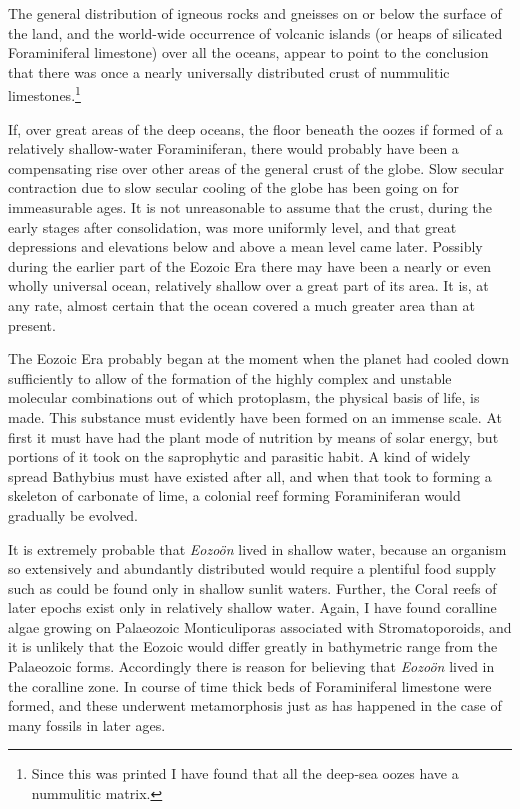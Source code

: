 \documentclass[a4paper, 12pt, oneside]{article}
\begin{document}
The general distribution of igneous rocks and gneisses on or below the surface of the land, and the world-wide occurrence of volcanic islands (or heaps of silicated Foraminiferal limestone) over all the oceans, appear to point to the conclusion that there was once a nearly universally distributed crust of nummulitic limestones.\footnote{Since this was printed I have found that all the deep-sea oozes have a nummulitic matrix.}

If, over great areas of the deep oceans, the floor beneath the oozes if formed of a relatively shallow-water Foraminiferan, there would probably have been a compensating rise over other areas of the general crust of the globe. Slow secular contraction due to slow secular cooling of the globe has been going on for immeasurable ages. It is not unreasonable to assume that the crust, during the early stages after consolidation, was more uniformly level, and that great depressions and elevations below and above a mean level came later. Possibly during the earlier part of the Eozoic Era there may have been a nearly or even wholly universal ocean, relatively shallow over a great part of its area. It is, at any rate, almost certain that the ocean covered a much greater area than at present.

The Eozoic Era probably began at the moment when the planet had cooled down sufficiently to allow of the formation of the highly complex and unstable molecular combinations out of which protoplasm, the physical basis of life, is made. This substance must evidently have been formed on an immense scale. At first it must have had the plant mode of nutrition by means of solar energy, but portions of it took on the saprophytic and parasitic habit. A kind of widely spread Bathybius must have existed after all, and when that took to forming a skeleton of carbonate of lime, a colonial reef forming Foraminiferan would gradually be evolved.

It is extremely probable that \emph{Eozoön} lived in shallow water, because an organism so extensively and abundantly distributed would require a plentiful food supply such as could be found only in shallow sunlit waters. Further, the Coral reefs of later epochs exist only in relatively shallow water. Again, I have found coralline algae growing on Palaeozoic Monticuliporas associated with Stromatoporoids, and it is unlikely that the Eozoic would differ greatly in bathymetric range from the Palaeozoic forms. Accordingly there is reason for believing that \emph{Eozoön} lived in the coralline zone. In course of time thick beds of Foraminiferal limestone were formed, and these underwent metamorphosis just as has happened in the case of many fossils in later ages.
\end{document}
